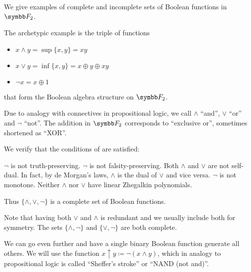 \begin{example}\label{ex:posts_completeness_theorem}
  We give examples of complete and incomplete sets of Boolean functions in \( \Fld_2 \).

  \begin{exenum}
     The archetypic example is the triple of functions
    \begin{itemize}
     \item \( x \land y = \sup \{ x, y \} = xy \)
     \item \( x \lor y = \inf \{ x, y \} = x \oplus y \oplus xy \)
     \item \( \neg x = x \oplus 1 \)
    \end{itemize}
    that form the Boolean algebra structure on \( \Fld_2 \).

    Due to analogy with connectives in propositional logic, we call \( \land \) \enquote{and}, \( \lor \) \enquote{or} and \( \neg \) \enquote{not}. The addition in \( \Fld_2 \) corresponds to \enquote{exclusive or}, sometimes shortened as \enquote{XOR}.

    We verify that the conditions of  are satisfied:
    \begin{description}
       \( \neg \) is not truth-preserving.
       \( \neg \) is not falsity-preserving.
       Both \( \land \) and \( \lor \) are not self-dual. In fact, by de Morgan's laws, \( \land \) is the dual of \( \lor \) and vice versa.
       \( \neg \) is not monotone.
       Neither \( \land \) nor \( \lor \) have linear Zhegalkin polynomials.
    \end{description}

    Thus \( \{ \land, \lor, \neg \} \) is a complete set of Boolean functions.

    Note that having both \( \lor \) and \( \land \) is redundant and we usually include both for symmetry. The sets \( \{ \land, \neg \} \) and \( \{ \lor, \neg \} \) are both complete.

     We can go even further and have a single binary Boolean function generate all others. We will use the function \( x \uparrow y \coloneqq \neg(x \land y) \), which in analogy to propositional logic is called \enquote{Sheffer's stroke} or \enquote{NAND (not and)}.


\end{exenum}
\end{example}
